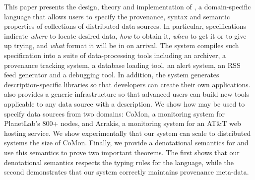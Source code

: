 
This paper presents the design, theory and implementation of
\padsd{}, a  domain-specific language that allows users to
specify the provenance, syntax and semantic properties of 
collections of distributed data sources.  In particular, \padsd{}
specifications indicate 
{\em where} to locate desired data, {\em how} to obtain it, {\em
when} to get it or to give up trying, and {\em what}
format it will be in on arrival.  The \padsd{} system compiles such
specification into a suite of data-processing tools including 
an archiver, a provenance tracking system, a database loading tool, 
an alert system, an RSS feed generator and a
debugging tool.  In addition, the system generates description-specific
libraries so that developers can create their
own applications. \padsd{} also provides a generic infrastructure
so that advanced users can build new tools applicable to any 
data source with a \padsd{} description.
We show how \padsd{} may be used to specify data sources from two domains:
CoMon, a monitoring system for PlanetLab's 800+ nodes, and Arrakis, a monitoring
system for an AT\&T web hosting service.  
We show experimentally that our system can scale to distributed
systems the size of CoMon.  
Finally, we provide a
denotational semantics for \padsd{} and use this semantics to prove two important
theorems.  The first shows that our denotational semantics respects the
typing rules for the language, while the second demonstrates that our 
system correctly maintains provenance meta-data.






